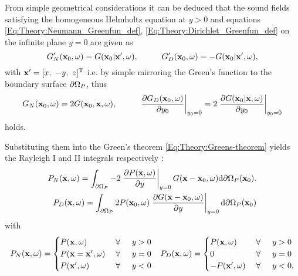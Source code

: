 From simple geometrical considerations it can be deduced that the sound fields satisfying the homogeneous Helmholtz equation at $y>0$ and equations \eqref{Eq:Theory:Neumann_Greenfun_def}, \eqref{Eq:Theory:Dirichlet_Greenfun_def} on the infinite plane $y=0$ are given as
\begin{equation}
 G'_N(\vxo,\omega) = G(\vxo|\vx',\omega), \hspace{10mm} G'_D(\vxo,\omega) = -G(\vxo|\vx',\omega),
\end{equation}
with $\mathbf{x}' = [x,\ -y,\ z]^{\mathrm{T}}$ i.e. by simple mirroring the Green's function to the boundary surface $\partial \Omega_P$, thus
\begin{equation}
G_N(\vxo,\omega) = 2G(\vxo,\vx,\omega), \hspace{10mm}  \left. \frac{\partial G_D(\vxo,\omega) }{\partial y_0} \right|_{y_0 = 0} = 2\left. \frac{\partial G(\vxo|\vx,\omega) }{\partial y_0} \right|_{y_0 = 0}
\end{equation}
holds.

Substituting them into the Green's theorem \eqref{Eq:Theory:Greens-theorem} yields the Rayleigh I and II integrals respectively \cite{Berkhout1984}:
\begin{eqnarray}
P_N(\mathbf{x},\omega) =
\int_{\partial \Omega_P}
-2
\left. \frac{\partial P(\mathbf{x},\omega)}{\partial y} \right|_{y = 0} 
G(\mathbf{x}-\mathbf{x}_0,\omega) \mathrm{d} \partial \Omega_P ( \mathbf{x}_0).
\label{Eq:Theory:RayleighI}
\\
P_D(\mathbf{x},\omega) =
\int_{\partial \Omega_P}
2 P(\mathbf{x}_0,\omega)  
\left. \frac{\partial G(\mathbf{x}-\mathbf{x}_0,\omega)}{\partial y} \right|_{y = 0} 
\mathrm{d} \partial \Omega_P ( \mathbf{x}_0)
\label{Eq:Theory:RayleighII}
\end{eqnarray}
with
\begin{align*}
P_N(\mathbf{x},\omega) = \begin{cases} 
P(\mathbf{x},\omega)           & \hspace{1mm} \forall \hspace{5mm}  y>0  	     \\
P(\mathbf{x} = \mathbf{x}',\omega) 			& \hspace{1mm} \forall \hspace{5mm}  y=0  \\
P(\mathbf{x}',\omega) 			& \hspace{1mm} \forall \hspace{5mm}  y<0
\end{cases}
&&
P_D(\mathbf{x},\omega) = \begin{cases} 
P(\mathbf{x},\omega)           & \hspace{1mm} \forall \hspace{5mm}  y>0  	     \\
0 			& \hspace{1mm} \forall \hspace{5mm}  y=0  \\
-P(\mathbf{x}',\omega) 			& \hspace{1mm} \forall \hspace{5mm}  y<0.
\end{cases}
\end{align*}

